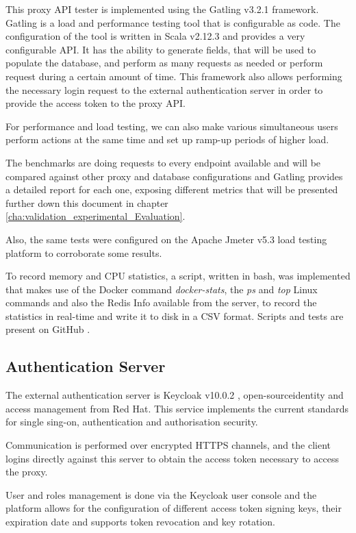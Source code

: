 This proxy \gls{API} tester is implemented using the Gatling v3.2.1 \cite{gatling:1} framework. Gatling is a load and performance testing tool that is configurable as code. The configuration of the tool is written in Scala v2.12.3 and provides a very configurable \gls{API}. It has the ability to generate fields, that will be used to populate the database, and perform as many requests as needed or perform request during a certain amount of time. This framework also allows performing the necessary login request to the external authentication server in order to provide the access token to the proxy API.

For performance and load testing, we can also make various simultaneous users perform actions at the same time and set up ramp-up periods of higher load.

The benchmarks are doing requests to every endpoint available and will be compared against other proxy and database configurations and Gatling provides a detailed report for each one, exposing different metrics that will be presented further down this document in chapter \ref{cha:validation_experimental_Evaluation}.

Also, the same tests were configured on the Apache Jmeter v5.3\cite{jmeter:1} load testing platform to corroborate some results.

To record memory and \gls{CPU} statistics, a script, written in bash, was implemented that makes use of the Docker command \textit{docker-stats}, the \textit{ps} and \textit{top} Linux commands and also the Redis Info available from the server, to record the statistics in real-time and write it to disk in a \gls{CSV} format. Scripts and tests are present on GitHub \cite{thesis-repository:client}.

\subsection{Authentication Server}
\label{ssec:implementation_authentication_server}

The external authentication server is Keycloak v10.0.2 \cite{keycloak:1}, open-sourceidentity and access management from Red Hat. This service implements the current standards for single sing-on, authentication and authorisation security.

Communication is performed over encrypted \gls{HTTPS} channels, and the client logins directly against this server to obtain the access token necessary to access the proxy.

User and roles management is done via the Keycloak user console and the platform allows for the configuration of different access token signing keys, their expiration date and supports token revocation and key rotation.

